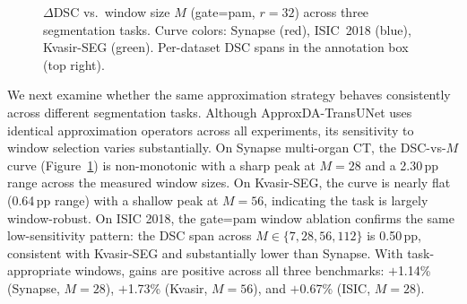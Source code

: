 \begin{figure}[!t]
\centering
{}
\caption{$\Delta$DSC vs.\ window size $M$ (gate=pam, $r{=}32$) across three
segmentation tasks. Curve colors: Synapse (red), ISIC~2018 (blue),
Kvasir-SEG (green). Per-dataset DSC spans in the annotation box (top right).}
\label{fig:dsc_vs_m}
\end{figure}

We next examine whether the same approximation strategy behaves consistently across different segmentation tasks. Although ApproxDA-TransUNet uses identical approximation operators across all experiments, its sensitivity to window selection varies substantially. On Synapse multi-organ CT, the DSC-vs-$M$ curve (Figure~\ref{fig:dsc_vs_m}) is non-monotonic with a sharp peak at $M{=}28$ and a 2.30\,pp range across the measured window sizes. On Kvasir-SEG, the curve is nearly flat (0.64\,pp range) with a shallow peak at $M{=}56$, indicating the task is largely window-robust. On ISIC 2018, the gate=pam window ablation confirms the same low-sensitivity pattern: the DSC span across $M{\in}\{7,28,56,112\}$ is 0.50\,pp, consistent with Kvasir-SEG and substantially lower than Synapse. With task-appropriate windows, gains are positive across all three benchmarks: $+$1.14\% (Synapse, $M{=}28$), $+$1.73\% (Kvasir, $M{=}56$), and $+$0.67\% (ISIC, $M{=}28$).

